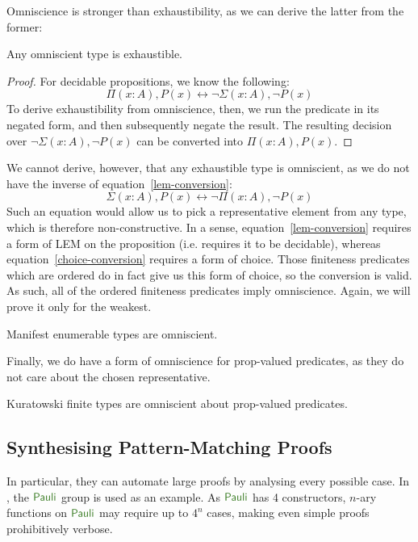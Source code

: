Omniscience is stronger than exhaustibility, as we can derive the latter from
the former:
\begin{rm-lemma} \label{omniscient-is-exhaustible}
  Any omniscient type is exhaustible.
\end{rm-lemma}
\begin{proof}
  For decidable propositions, we know the following:
  \begin{equation} \label{lem-conversion}
    \Pi (x : A) , P(x) \leftrightarrow \neg \Sigma (x : A) , \neg P(x) 
  \end{equation}
  To derive exhaustibility from omniscience, then, we run the predicate in its
  negated form, and then subsequently negate the result.
  The resulting decision over \(\neg \Sigma(x : A) , \neg P(x)\) can be
  converted into \(\Pi (x : A) , P(x)\).
\end{proof}
We cannot derive, however, that any exhaustible type is omniscient, as we do not
have the inverse of equation~\ref{lem-conversion}:
\begin{equation} \label{choice-conversion}
  \Sigma (x : A) , P(x) \leftrightarrow \neg \Pi (x : A) , \neg P(x)
\end{equation}
Such an equation would allow us to pick a representative element from any type,
which is therefore non-constructive.
In a sense, equation~\ref{lem-conversion} requires a form of LEM on the
proposition (i.e. requires it to be decidable), whereas
equation~\ref{choice-conversion} requires a form of choice.
Those finiteness predicates which are ordered do in fact give us this form of
choice, so the conversion is valid.
As such, all of the ordered finiteness predicates imply omniscience.
Again, we will prove it only for the weakest.
\begin{rm-theorem}
  Manifest enumerable types are omniscient.
\end{rm-theorem}
Finally, we do have a form of omniscience for prop-valued predicates, as they do
not care about the chosen representative.
\begin{rm-theorem}
  Kuratowski finite types are omniscient about prop-valued predicates.
\end{rm-theorem}
\subsection{Synthesising Pattern-Matching Proofs}
In particular, they can automate large proofs by analysing every possible case.
In \cite{firsovDependentlyTypedProgramming2015}, the \(\AgdaDatatype{Pauli}\)
group is used as an example.
As \(\AgdaDatatype{Pauli}\) has 4 constructors, \(n\)-ary functions on
\(\AgdaDatatype{Pauli}\) may require up to \(4^n\) cases, making even simple
proofs prohibitively verbose.

